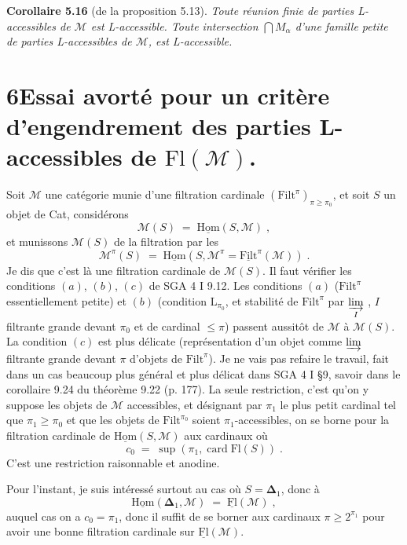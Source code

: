 \documentclass[11pt]{article}
\newcommand{\printedpage}[1]{\marginpar{\footnotesize p.~#1}}
\newcommand{\msp}[1]{\marginpar{\footnotesize [#1]}}
\newcommand{\Filt}{\mathrm{Filt}}
\newcommand{\Fl}{\mathrm{Fl}}
\newcommand{\card}{\operatorname{card}}
\newcommand{\uHom}{\underline{\mathrm{Hom}}}
\newcommand{\uFl}{\underline{\mathrm{Fl}}}
\begin{document}
\msp{page 73}
\textbf{Corollaire 5.16} (de la proposition 5.13). \textit{Toute réunion finie de parties L-accessibles de $\mathcal{M}$ est L-accessible. Toute intersection $\bigcap M_{\alpha}$ d'une famille petite de parties L-accessibles de $\mathcal{M}$, est L-accessible.}

\printedpage{41}

\section*{6\quad Essai avorté pour un critère d'engendrement des parties L-accessibles de $\Fl(\mathcal{M})$.}

Soit $\mathcal{M}$ une catégorie munie d'une filtration cardinale $(\Filt^{\pi})_{\pi\geq\pi_{0}}$, et soit $S$ un objet de Cat, considérons
\[
\mathcal{M}(S) \;=\; \uHom(S,\mathcal{M}) \; ,
\]
et munissons $\mathcal{M}(S)$ de la filtration par les
\[
\mathcal{M}^{\pi}(S) \;=\; \uHom(S,\mathcal{M}^{\pi} = \underline{\Filt}^{\pi}(\mathcal{M})) \; .
\]
Je dis que c'est là une filtration cardinale de $\mathcal{M}(S)$. Il faut vérifier les conditions $(a)$, $(b)$, $(c)$ de SGA 4 I 9.12. Les conditions $(a)$ ($\Filt^{\pi}$ essentiellement petite) et $(b)$ (condition $\mathrm{L}_{\pi_{0}}$, et stabilité de $\Filt^{\pi}$ par $\varinjlim\limits_{I}$ , $I$ filtrante grande devant $\pi_{0}$ et de cardinal $\leq \pi$) passent aussitôt de $\mathcal{M}$ à $\mathcal{M}(S)$. La condition $(c)$ est plus délicate (représentation
\msp{page 74}
d'un objet comme $\varinjlim$ filtrante grande devant $\pi$ d'objets de $\Filt^{\pi}$). Je ne vais pas refaire le travail, fait dans un cas beaucoup plus général et plus délicat dans SGA 4 I §9, savoir dans le corollaire 9.24 du théorème 9.22 (p. 177). La seule restriction, c'est qu'on y suppose les objets de $\mathcal{M}$ accessibles, et désignant par $\pi_{1}$ le plus petit cardinal tel que $\pi_{1} \geq \pi_{0}$ et que les objets de $\Filt^{\pi_{0}}$ soient $\pi_{1}$-accessibles, on se borne pour la filtration cardinale de $\uHom(S,\mathcal{M})$ aux cardinaux  où
\[
c_{0} \;=\; \sup(\pi_{1}, \card \Fl(S)) \; .
\]
C'est une restriction raisonnable et anodine.

Pour l'instant, je suis intéressé surtout au cas où $S = \boldsymbol{\Delta}_{1}$, donc à
\[
\uHom(\boldsymbol{\Delta}_{1},\mathcal{M}) \;=\; \uFl(\mathcal{M}) \; ,
\]
auquel cas on a $c_{0} = \pi_{1}$, donc il suffit de se borner aux cardinaux $\pi \geq 2^{\pi_{1}}$ pour avoir une bonne filtration cardinale sur $\uFl(\mathcal{M})$.
\end{document}
